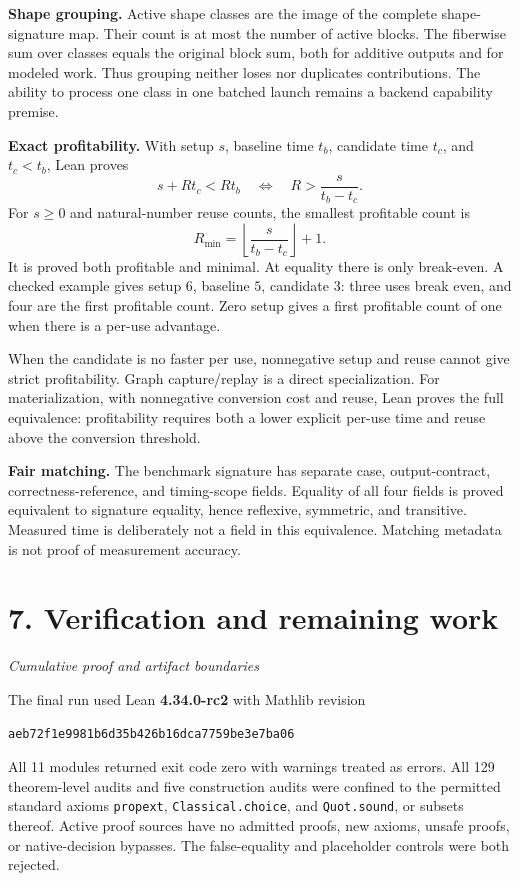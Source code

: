 \documentclass[11pt]{article}
\newcommand{\code}[1]{\texttt{\small #1}}
\newcommand{\pageheading}[2]{\section*{\color{ink}#1}\textit{#2}\par}
\begin{document}
\textbf{Shape grouping.} Active shape classes are the image of the complete shape-signature map. Their count is at most the number of active blocks. The fiberwise sum over classes equals the original block sum, both for additive outputs and for modeled work. Thus grouping neither loses nor duplicates contributions. The ability to process one class in one batched launch remains a backend capability premise.

\textbf{Exact profitability.} With setup $s$, baseline time $t_b$, candidate time $t_c$, and $t_c<t_b$, Lean proves
\[
\boxed{s+Rt_c<Rt_b\quad\Longleftrightarrow\quad
R>\frac{s}{t_b-t_c}.}
\]
For $s\geq0$ and natural-number reuse counts, the smallest profitable count is
\[
\boxed{R_{\min}=\left\lfloor\frac{s}{t_b-t_c}\right\rfloor+1.}
\]
It is proved both profitable and minimal. At equality there is only break-even. A checked example gives setup $6$, baseline $5$, candidate $3$: three uses break even, and four are the first profitable count. Zero setup gives a first profitable count of one when there is a per-use advantage.

When the candidate is no faster per use, nonnegative setup and reuse cannot give strict profitability. Graph capture/replay is a direct specialization. For materialization, with nonnegative conversion cost and reuse, Lean proves the full equivalence: profitability requires both a lower explicit per-use time and reuse above the conversion threshold.

\textbf{Fair matching.} The benchmark signature has separate case, output-contract, correctness-reference, and timing-scope fields. Equality of all four fields is proved equivalent to signature equality, hence reflexive, symmetric, and transitive. Measured time is deliberately not a field in this equivalence. Matching metadata is not proof of measurement accuracy.

\newpage
\pageheading{7. Verification and remaining work}{Cumulative proof and artifact boundaries}
The final run used Lean \textbf{4.34.0-rc2} with Mathlib revision
\begin{center}\code{aeb72f1e9981b6d35b426b16dca7759be3e7ba06}\end{center}
All 11 modules returned exit code zero with warnings treated as errors. All 129 theorem-level audits and five construction audits were confined to the permitted standard axioms \code{propext}, \code{Classical.choice}, and \code{Quot.sound}, or subsets thereof. Active proof sources have no admitted proofs, new axioms, unsafe proofs, or native-decision bypasses. The false-equality and placeholder controls were both rejected.
\end{document}
